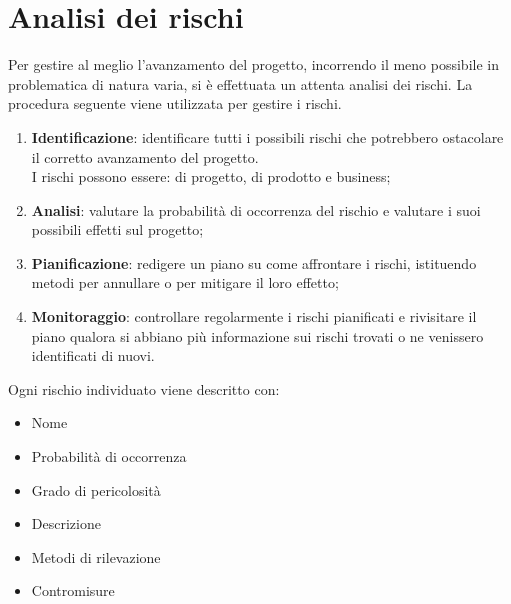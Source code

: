 %
%


\section{Analisi dei rischi} %
\label{sec:analisi_dei_rischi}
Per gestire al meglio l'avanzamento del progetto, incorrendo il meno possibile in problematica di natura varia, si è effettuata un attenta analisi dei rischi. La procedura seguente viene utilizzata per gestire i rischi.
	\begin{enumerate}
		\item \textbf{Identificazione}: identificare tutti i possibili rischi che potrebbero ostacolare il corretto avanzamento del progetto. \\
		I rischi possono essere: di progetto, di prodotto e business;
		\item \textbf{Analisi}: valutare la probabilità di occorrenza del rischio e valutare i suoi possibili effetti sul progetto;
		\item \textbf{Pianificazione}: redigere un piano su come affrontare i rischi, istituendo metodi per annullare o per mitigare il loro effetto;
		\item \textbf{Monitoraggio}: controllare regolarmente i rischi pianificati e rivisitare il piano qualora si abbiano più informazione sui rischi trovati o ne venissero identificati di nuovi.
	\end{enumerate}
\noindent
Ogni rischio individuato viene descritto con: 
	\begin{itemize}
		\item Nome
		\item Probabilità di occorrenza
		\item Grado di pericolosità
		\item Descrizione
		\item Metodi di rilevazione
		\item Contromisure
	\end{itemize}
